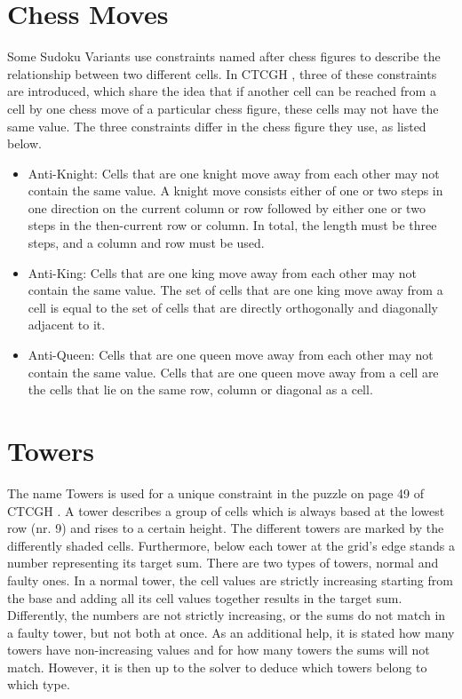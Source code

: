 \section{Chess Moves}
Some Sudoku Variants use constraints named after chess figures to describe the relationship between two different cells. In CTCGH \cite{CrackingTheCryptic2021}, three of these constraints are introduced, which share the idea that if another cell can be reached from a cell by one chess move of a particular chess figure, these cells may not have the same value. The three constraints differ in the chess figure they use, as listed below.
\begin{itemize}
    \item Anti-Knight: Cells that are one knight move away from each other may not contain the same value. A knight move consists either of one or two steps in one direction on the current column or row followed by either one or two steps in the then-current row or column. In total, the length must be three steps, and a column and row must be used.
    \item Anti-King: Cells that are one king move away from each other may not contain the same value. The set of cells that are one king move away from a cell is equal to the set of cells that are directly orthogonally and diagonally adjacent to it.
    \item Anti-Queen: Cells that are one queen move away from each other may not contain the same value. Cells that are one queen move away from a cell are the cells that lie on the same row, column or diagonal as a cell.
\end{itemize}

\section{Towers}
The name Towers is used for a unique constraint in the puzzle on page 49 of CTCGH \cite{CrackingTheCryptic2021}. A tower describes a group of cells which is always based at the lowest row (nr. 9) and rises to a certain height. The different towers are marked by the differently shaded cells. Furthermore, below each tower at the grid's edge stands a number representing its target sum. There are two types of towers, normal and faulty ones. In a normal tower, the cell values are strictly increasing starting from the base and adding all its cell values together results in the target sum. Differently, the numbers are not strictly increasing, or the sums do not match in a faulty tower, but not both at once. As an additional help, it is stated how many towers have non-increasing values and for how many towers the sums will not match. However, it is then up to the solver to deduce which towers belong to which type.
